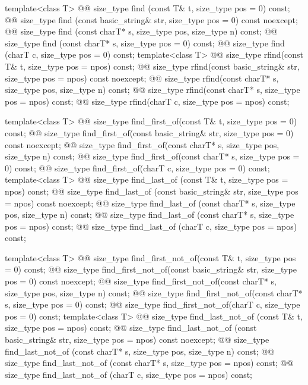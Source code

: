 \documentclass{wg21}
\begin{document}
\begin{codeblock}
{{    template<class T>
      @@ size_type find (const T& t, size_type pos = 0) const;
    @@ size_type find (const basic_string& str, size_type pos = 0) const noexcept;
    @@ size_type find (const charT* s, size_type pos, size_type n) const;
    @@ size_type find (const charT* s, size_type pos = 0) const;
    @@ size_type find (charT c, size_type pos = 0) const;
    template<class T>
      @@ size_type rfind(const T& t, size_type pos = npos) const;
    @@ size_type rfind(const basic_string& str, size_type pos = npos) const noexcept;
    @@ size_type rfind(const charT* s, size_type pos, size_type n) const;
    @@ size_type rfind(const charT* s, size_type pos = npos) const;
    @@ size_type rfind(charT c, size_type pos = npos) const;

    template<class T>
      @@ size_type find_first_of(const T& t, size_type pos = 0) const;
    @@ size_type find_first_of(const basic_string& str, size_type pos = 0) const noexcept;
    @@ size_type find_first_of(const charT* s, size_type pos, size_type n) const;
    @@ size_type find_first_of(const charT* s, size_type pos = 0) const;
    @@ size_type find_first_of(charT c, size_type pos = 0) const;
    template<class T>
      @@ size_type find_last_of (const T& t, size_type pos = npos) const;
    @@ size_type find_last_of (const basic_string& str, size_type pos = npos) const noexcept;
    @@ size_type find_last_of (const charT* s, size_type pos, size_type n) const;
    @@ size_type find_last_of (const charT* s, size_type pos = npos) const;
    @@ size_type find_last_of (charT c, size_type pos = npos) const;

    template<class T>
      @@
      size_type find_first_not_of(const T& t, size_type pos = 0) const;
    @@ size_type
    find_first_not_of(const basic_string& str, size_type pos = 0) const noexcept;
    @@ size_type
    find_first_not_of(const charT* s, size_type pos, size_type n) const;
    @@ size_type
    find_first_not_of(const charT* s, size_type pos = 0) const;
    @@ size_type
    find_first_not_of(charT c, size_type pos = 0) const;
    template<class T>
      @@
      size_type find_last_not_of (const T& t, size_type pos = npos) const;
    @@
    size_type find_last_not_of (const basic_string& str, size_type pos = npos) const noexcept;
    @@
    size_type find_last_not_of (const charT* s, size_type pos, size_type n) const;
    @@
    size_type find_last_not_of (const charT* s, size_type pos = npos) const;
    @@
    size_type find_last_not_of (charT c, size_type pos = npos) const;

}}
\end{codeblock}
\end{document}
